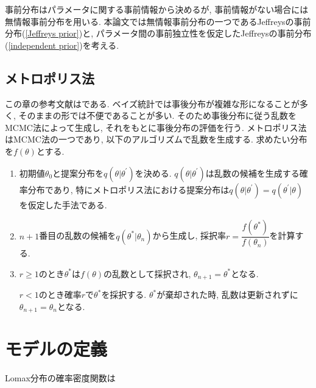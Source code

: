 \documentclass[titlepage,twoside]{jarticle}
\theoremstyle{definition}
\begin{document}
事前分布はパラメータに関する事前情報から決めるが, 事前情報がない場合には無情報事前分布を用いる. 本論文では無情報事前分布の一つであるJeffreysの事前分布(\ref{Jeffreys prior})と, パラメータ間の事前独立性を仮定したJeffreysの事前分布(\ref{independent prior})を考える.

\subsection{メトロポリス法}\label{metropolis}

この章の参考文献は\cite{wakui}である. ベイズ統計では事後分布が複雑な形になることが多く, そのままの形では不便であることが多い. そのため事後分布に従う乱数をMCMC法によって生成し, それをもとに事後分布の評価を行う. メトロポリス法はMCMC法の一つであり, 以下のアルゴリズムで乱数を生成する. 求めたい分布を$f(\theta)$とする.

\begin{enumerate}
\item 初期値$\theta_0$と提案分布を$q(\theta|\theta^{\prime})$を決める. 
$q(\theta|\theta^{\prime})$は乱数の候補を生成する確率分布であり, 特にメトロポリス法における提案分布は$q(\theta|\theta^{\prime})=q(\theta^{\prime}|\theta)$を仮定した手法である. 

\item $n+1$番目の乱数の候補を$q(\theta^{*}|\theta_n)$から生成し, 採択率$r = \dfrac{f(\theta^{*})}{f(\theta_n)}$を計算する. 

\item $r\geq1$のとき$\theta^{*}$は$f(\theta)$の乱数として採択され, $\theta_{n+1}=\theta^{*}$となる.

$r<1$のとき確率$r$で$\theta^{*}$を採択する. $\theta^{*}$が棄却された時, 乱数は更新されずに$\theta_{n+1}=\theta_n$となる. 
\end{enumerate}

\section{モデルの定義}\label{definition}

Lomax分布の確率密度関数は
\end{document}
